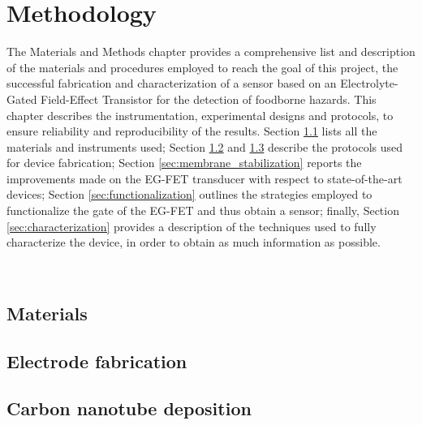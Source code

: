 \chapter{Methodology}
\label{cap:chapter2}

The Materials and Methods chapter provides a comprehensive list and description of the materials and procedures employed to reach the goal of this project, \ie{} the successful fabrication and characterization of a sensor based on an Electrolyte-Gated Field-Effect Transistor for the detection of foodborne hazards. This chapter describes the instrumentation, experimental designs and  protocols, to ensure reliability and reproducibility of the results. Section \ref{sec:materials} lists all the materials and instruments used; Section \ref{sec:fabrication} and \ref{sec:cntDeposition} describe the protocols used for device fabrication; Section \ref{sec:membrane_stabilization} reports the improvements made on the EG-FET transducer with respect to state-of-the-art devices; Section \ref{sec:functionalization} outlines the strategies employed to functionalize the gate of the EG-FET and thus obtain a sensor; finally, Section \ref{sec:characterization} provides a description of the techniques used to fully characterize the device, in order to obtain as much information as possible.

\newpage
\thispagestyle{empty}
\ %
\newpage

\section{Materials} 
\label{sec:materials}

%


\section{Electrode fabrication} 
\label{sec:fabrication}

%


\section{Carbon nanotube deposition}
\label{sec:cntDeposition}

